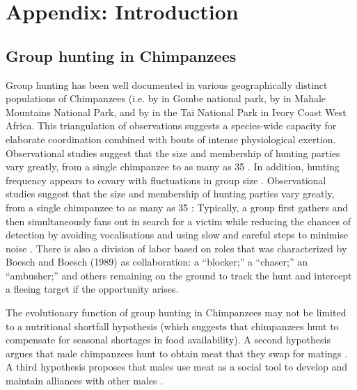 \chapter{\label{app1:intro}Appendix: Introduction}









\section{Group hunting in Chimpanzees\label{sect:groupHunt}}
Group hunting has been well documented in various geographically distinct populations of Chimpanzees (i.e. by \textcite{Goodall1986}  in Gombe national park, by \textcite{Uehara1997} in Mahale Mountains National Park, and by \textcite{Boesch1989, Boesch1994} in the Tai National Park in Ivory Coast West Africa.  This triangulation of observations suggests a species-wide capacity for elaborate coordination combined with bouts of intense physiological exertion.   Observational studies suggest that the size and membership of hunting parties vary greatly, from a single chimpanzee to as many as 35 \citep{Stanford1994}.  In addition, hunting frequency appears to covary with fluctuations in group size  \citep[and particularly number of sexually receptive females in the group; see][]{Stanford1996}.
Observational studies suggest that the size and membership of hunting parties vary greatly, from a single chimpanzee to as many as 35 \citep{Stanford1994}: Typically, a group first gathers and then simultaneously fans out in search for a victim while reducing the chances of detection by avoiding vocalisations and using slow and careful steps to minimise noise \citep{Boesch1989,Mitani2001}.  There is also a division of labor based on roles that was characterized by Boesch and Boesch (1989) as collaboration: a ``blocker;'' a ``chaser;'' an ``ambusher;'' and others remaining on the ground to track the hunt and intercept a fleeing target if the opportunity arises.

The evolutionary function of group hunting in Chimpanzees may not be limited to a nutritional shortfall hypothesis (which suggests that chimpanzees hunt to compensate for seasonal shortages in food availability).  A second hypothesis argues that male chimpanzees hunt to obtain meat that they swap for matings \citep{Stanford1994}. A third hypothesis proposes that males use meat as a social tool to develop and maintain alliances with other males \citep{Mitani2001}.



